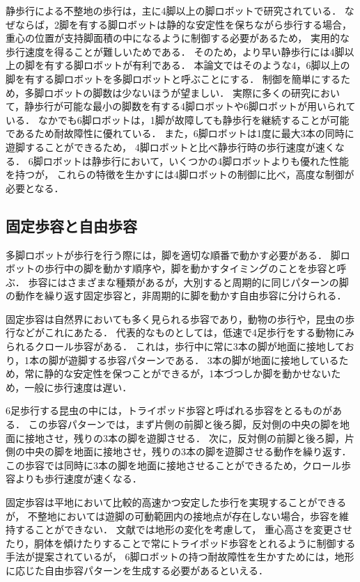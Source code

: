 静歩行による不整地の歩行は，主に4脚以上の脚ロボットで研究されている．
なぜならば，2脚を有する脚ロボットは静的な安定性を保ちながら歩行する場合，
重心の位置が支持脚面積の中になるように制御する必要があるため，
実用的な歩行速度を得ることが難しいためである．
そのため，より早い静歩行には4脚以上の脚を有する脚ロボットが有利である．
本論文ではそのような4，6脚以上の脚を有する脚ロボットを多脚ロボットと呼ぶことにする．
制御を簡単にするため，多脚ロボットの脚数は少ないほうが望ましい．
実際に多くの研究において，静歩行が可能な最小の脚数を有する4脚ロボットや6脚ロボットが用いられている．
なかでも6脚ロボットは，1脚が故障しても静歩行を継続することが可能であるため耐故障性に優れている．
また，6脚ロボットは1度に最大3本の同時に遊脚することができるため，
4脚ロボットと比べ静歩行時の歩行速度が速くなる．
6脚ロボットは静歩行において，いくつかの4脚ロボットよりも優れた性能を持つが，
これらの特徴を生かすには4脚ロボットの制御に比べ，高度な制御が必要となる．

\subsection{固定歩容と自由歩容}
多脚ロボットが歩行を行う際には，脚を適切な順番で動かす必要がある．
脚ロボットの歩行中の脚を動かす順序や，脚を動かすタイミングのことを歩容と呼ぶ．
歩容にはさまざまな種類があるが，大別すると周期的に同じパターンの脚の動作を繰り返す固定歩容と，非周期的に脚を動かす自由歩容に分けられる．

固定歩容は自然界においても多く見られる歩容であり，動物の歩行や，昆虫の歩行などがこれにあたる．
代表的なものとしては，低速で4足歩行をする動物にみられるクロール歩容がある．
これは，歩行中に常に3本の脚が地面に接地しており，1本の脚が遊脚する歩容パターンである．
3本の脚が地面に接地しているため，常に静的な安定性を保つことができるが，1本づつしか脚を動かせないため，一般に歩行速度は遅い．

6足歩行する昆虫の中には，トライポッド歩容と呼ばれる歩容をとるものがある．
この歩容パターンでは，まず片側の前脚と後ろ脚，反対側の中央の脚を地面に接地させ，残りの3本の脚を遊脚させる．
次に，反対側の前脚と後ろ脚，片側の中央の脚を地面に接地させ，残りの3本の脚を遊脚させる動作を繰り返す．
この歩容では同時に3本の脚を地面に接地させることができるため，クロール歩容よりも歩行速度が速くなる．

固定歩容は平地において比較的高速かつ安定した歩行を実現することができるが，
不整地においては遊脚の可動範囲内の接地点が存在しない場合，歩容を維持することができない．
文献\cite{cita:satou_tripod_gait}では地形の変化を考慮して，
重心高さを変更させたり，胴体を傾けたりすることで常にトライポッド歩容をとれるように制御する手法が提案されているが，
6脚ロボットの持つ耐故障性を生かすためには，地形に応じた自由歩容パターンを生成する必要があるといえる．

